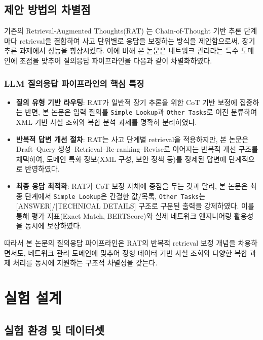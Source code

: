 \documentclass[twocolumn, 10pt]{article}
\begin{document}
\subsection{제안 방법의 차별점}

기존의 Retrieval-Augmented Thoughts(RAT) \cite{wang2024rat}는 Chain-of-Thought
기반 추론 단계마다 retrieval을 결합하여 사고 단위별로 응답을 보정하는 방식을 제안함으로써,
장기 추론 과제에서 성능을 향상시켰다. 이에 비해 본 논문은 네트워크 관리라는 특수
도메인에 초점을 맞추어 질의응답 파이프라인을 다음과 같이 차별화하였다.

\subsubsection{LLM 질의응답 파이프라인의 핵심 특징}
\begin{itemize}
\item \textbf{질의 유형 기반 라우팅}: RAT가 일반적 장기 추론을 위한 CoT 기반
  보정에 집중하는 반면, 본 논문은 입력 질의를 \texttt{Simple Lookup}과
  \texttt{Other Tasks}로 이진 분류하여 XML 기반 사실 조회와 복합 분석 과제를
  명확히 분리하였다.

\item \textbf{반복적 답변 개선 절차}: RAT는 사고 단계별 retrieval을 적용하지만,
  본 논문은 Draft–Query 생성–Retrieval–Re-ranking–Revise로 이어지는 반복적
  개선 구조를 채택하여, 도메인 특화 정보(XML 구성, 보안 정책 등)를 정제된
  답변에 단계적으로 반영하였다.

\item \textbf{최종 응답 최적화}: RAT가 CoT 보정 자체에 중점을 두는 것과 달리,
  본 논문은 최종 단계에서 \texttt{Simple Lookup}은 간결한 값/목록, \texttt{Other
  Tasks}는 [ANSWER]/[TECHNICAL DETAILS] 구조로 구분된 출력을 강제하였다.
  이를 통해 평가 지표(Exact Match, BERTScore)와 실제 네트워크 엔지니어링 활용성을
  동시에 보장하였다.
\end{itemize}

따라서 본 논문의 질의응답 파이프라인은 RAT의 반복적 retrieval 보정 개념을
차용하면서도, 네트워크 관리 도메인에 맞추어 정형 데이터 기반 사실 조회와 다양한
복합 과제 처리를 동시에 지원하는 구조적 차별성을 갖는다.

\section{실험 설계}

\subsection{실험 환경 및 데이터셋}
\end{document}
